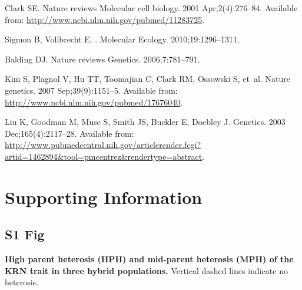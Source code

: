 \documentclass[10pt,letterpaper]{article}
\begin{document}
\begin{thebibliography}{10}
Clark SE.
\newblock Nature reviews Molecular cell biology. 2001 Apr;2(4):276--84.
\newblock Available from: \url{http://www.ncbi.nlm.nih.gov/pubmed/11283725}.

Sigmon B, Vollbrecht E.
.
\newblock Molecular Ecology. 2010;19:1296--1311.

Balding DJ.
\newblock Nature reviews Genetics. 2006;7:781--791.

Kim S, Plagnol V, Hu TT, Toomajian C, Clark RM, Ossowski S, et~al.
\newblock Nature genetics. 2007 Sep;39(9):1151--5.
\newblock Available from: \url{http://www.ncbi.nlm.nih.gov/pubmed/17676040}.

Liu K, Goodman M, Muse S, Smith JS, Buckler E, Doebley J.
\newblock Genetics. 2003 Dec;165(4):2117--28.
\newblock Available from:
  \url{http://www.pubmedcentral.nih.gov/articlerender.fcgi?artid=1462894\&tool=pmcentrez\&rendertype=abstract}.

\end{thebibliography}




\section*{Supporting Information}


\subsection*{S1 Fig}
\label{Fig_S1}
{\bf High parent heterosis (HPH) and mid-parent heterosis (MPH) of the KRN trait in three hybrid populations.} Vertical dashed lines indicate no heterosis.
\end{document}
